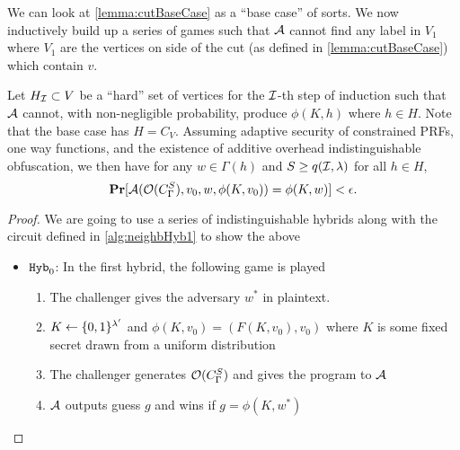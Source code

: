 We can look at \cref{lemma:cutBaseCase} as a ``base case'' of sorts. We now inductively build up a series of games
such that $\mathcal{A}$ cannot find any label in $V_1$ where $V_1$ are the vertices on side of the cut (as defined in \cref{lemma:cutBaseCase})
which contain $v$.

\begin{lemma}
	Let $H_{\mathcal{I}} \subset V$ be a ``hard'' set of vertices for the $\mathcal{I}$-th step of induction such that $\mathcal{A}$ cannot, with non-negligible probability, produce 
	$\phi(K, h)$ where $h \in H$. Note that the base case has $H = C_V$. 
	Assuming adaptive security of constrained PRFs, one way functions, and the existence of additive overhead indistinguishable obfuscation,
	we then have
	for any $w \in \Gamma(h)$ and $S \geq q(\mathcal{I}, \lambda)$ for all $h \in H$, 
	\begin{equation*}
		\operatorname*{\mathbf{Pr}}[\mathcal{A}(\mathcal{O}({C_\Gamma^S}), v_0, w, \phi(K, v_0)) = \phi(K, w)] < \epsilon.
	\end{equation*}
	\begin{proof}
		We are going to use a series of indistinguishable hybrids along with the circuit defined in \ref{alg:neighbHyb1} to show the above
		\begin{itemize}
			\item $\texttt{Hyb}_0$: In the first hybrid, the following game is played
				\begin{enumerate}
					\item The challenger gives the adversary $w^*$ in plaintext.
					\item $K \gets \{0,1\}^{\lambda'}$ and $\phi(K, v_0) = (F(K, v_0), v_0)$ where $K$ is some fixed secret drawn from a uniform distribution
					\item The challenger generates $\mathcal{O}({C_\Gamma^S})$ and gives the program to $\mathcal{A}$
					\item $\mathcal{A}$ outputs guess $g$ and wins if $g = \phi(K, w^*)$ %
				\end{enumerate}
			

\end{itemize}
\end{proof}
\end{lemma}
